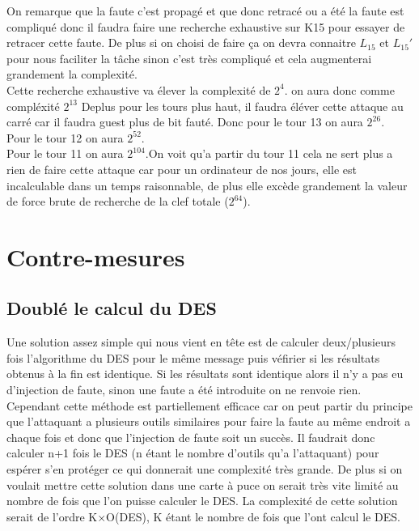 \documentclass[a4paper]{report}
\begin{document}
			On remarque que la faute c'est propagé et que donc retracé ou a été la faute est compliqué donc il faudra faire une recherche exhaustive sur K15 pour essayer de retracer cette faute. De plus si on choisi de faire ça on devra connaitre $L_15$ et $L_15'$ pour nous faciliter la tâche sinon c'est très compliqué et cela augmenterai grandement la complexité.\\ 
			Cette recherche exhaustive va élever la complexité de $2^{4}$. on aura donc comme compléxité $2^{13}$
			Deplus pour les tours plus haut, il faudra éléver cette attaque au carré car il faudra guest plus de bit fauté.
			Donc pour le tour 13 on aura $2^{26}$.\\
			Pour le tour 12 on aura $2^{52}$.\\
			Pour le tour 11 on aura $2^{104}$.On voit qu'a partir du tour 11 cela ne sert plus a rien de faire cette attaque car pour un ordinateur de nos jours, elle est incalculable dans un temps raisonnable, de plus elle excède grandement la valeur de force brute de recherche de la clef totale ($2^{64}$).
		\chapter{Contre-mesures}
			\section{Doublé le calcul du DES}
				Une solution assez simple qui nous vient en tête est de calculer deux/plusieurs fois l'algorithme du DES pour le même message puis véfirier si les résultats obtenus à la fin est
				identique.
				Si les résultats sont identique alors il n'y a pas eu d'injection de faute, sinon une faute a été introduite on ne renvoie rien.
				Cependant cette méthode est partiellement efficace car on peut partir du principe que l'attaquant a plusieurs outils similaires pour faire la faute au même endroit a chaque fois et 
				donc que l'injection de faute soit un succès. 
				Il faudrait donc calculer n+1 fois le DES (n étant le nombre d'outils qu'a l'attaquant) pour espérer s'en protéger ce qui donnerait une complexité très grande. 
				De plus si on voulait mettre cette solution dans une carte à puce on serait très vite limité au nombre de fois que l'on puisse calculer le DES.
				La complexité de cette solution serait de l'ordre K$\times$O(DES), K étant le nombre de fois que l'ont calcul le DES.
\end{document}
